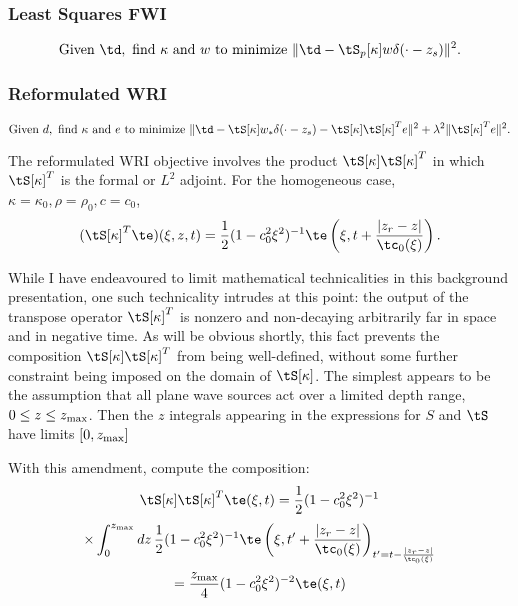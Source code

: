 \subsubsection{Least Squares FWI}

\begin{equation}
  \label{eqn:defolspw}
  \mbox{Given } \td, \mbox{ find }\kappa \mbox{ and }w \mbox{ to
    minimize }
  \| \td -  \tS_p[\kappa]w\delta(\cdot-z_s)\|^2.
\end{equation}

\subsubsection{Reformulated WRI}

\begin{equation}
  \label{eqn:defwrireformpw}
  \mbox{Given } d, \mbox{ find }\kappa \mbox{ and }e \mbox{ to
    minimize }
  \| \td -  \tS[\kappa]w_*\delta(\cdot-z_s) - \tS[\kappa]\tS[\kappa]^Te\|^2+\lambda^2\|\tS[\kappa]^Te\|^2.
\end{equation}
                              
The reformulated WRI objective involves 
the product $\tS[\kappa]\tS[\kappa]^T$ in which $\tS[\kappa]^T$ is the
formal or $L^2$ adjoint. For the homogeneous case,
$\kappa=\kappa_0,\rho=\rho_0,c=c_0$,
\begin{equation}
  \label{eqn:stmodhompwtrans}
  (\tS[\kappa]^T\te)(\xi,z,t)=\frac{1}{2}(1-c_0^2\xi^2)^{-1}\te\left(\xi,t +
    \frac{|z_r-z|}{\tc_0(\xi)}\right).
\end{equation}

While I have endeavoured to limit mathematical technicalities in this background
presentation, one such technicality intrudes at this point: the
output of the transpose operator $\tS[\kappa]^T$ is nonzero and non-decaying arbitrarily
far in space and in negative time. As will be obvious shortly, this
fact prevents the composition $\tS[\kappa]\tS[\kappa]^T$ from being
well-defined, without some further constraint being imposed on the
domain of $\tS[\kappa]$. The simplest appears to be the assumption
that all plane wave sources act over a limited depth range, $0 \le z
\le z_{\rm max}$. Then the $z$ integrals appearing in the expressions
for $S$ and $\tS$ have limits $[0,z_{\rm max}]$

With this amendment, compute the composition:
\[
  \tS[\kappa]\tS[\kappa]^T\te(\xi,t) = \frac{1}{2}(1-c_0^2\xi^2)^{-1}
\]
\[
  \times 
  \int_0^{z_{\rm max}} dz\, \frac{1}{2}(1-c_0^2\xi^2)^{-1}\te\left(\xi,t' +
    \frac{|z_r-z|}{\tc_0(\xi)}\right)_{t'=t-\frac{|z_r-z|}{\tc_0(\xi)}}
\]
\begin{equation}
  \label{eqn:stmodhompwnorm}
 = \frac{z_{\rm max}}{4}(1-c_0^2\xi^2)^{-2}\te(\xi,t)
\end{equation}

